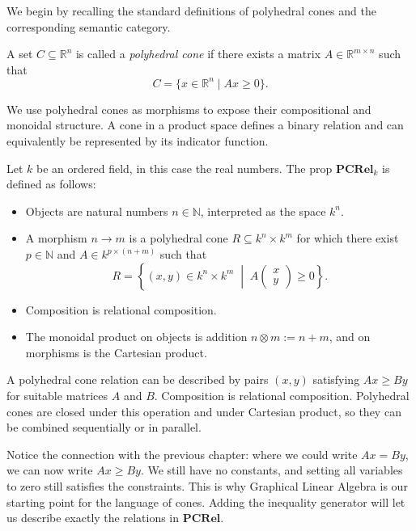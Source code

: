 We begin by recalling the standard definitions of polyhedral cones and the corresponding semantic category.

\begin{definition}\label{def:pcform}
    A set $C \subseteq \mathbb{R}^n$ is called a \emph{polyhedral cone} if
    there exists a matrix $A \in \mathbb{R}^{m \times n}$ such that
    \[
        C = \{x \in \mathbb{R}^n \mid Ax \ge 0\}.
    \]
\end{definition}

We use polyhedral cones as morphisms to expose their compositional and
monoidal structure. A cone in a product space defines a binary relation and
can equivalently be represented by its indicator function.

\begin{definition}
    Let $k$ be an ordered field, in this case the real numbers. The prop
    $\mathbf{PCRel}_k$ is defined as follows:
    \begin{itemize}
        \item Objects are natural numbers $n \in \mathbb{N}$, interpreted
            as the space $k^n$.
        \item A morphism $n \to m$ is a polyhedral cone
            $R \subseteq k^n \times k^m$
            for which there exist $p \in \mathbb{N}$ and
            $A \in k^{p \times (n+m)}$ such that
            \[
                R = \left\{ (x,y) \in k^n \times k^m \;\middle|\;
                A \begin{pmatrix} x \\ y \end{pmatrix} \ge 0 \right\}.
            \]
        \item Composition is relational composition.
        \item The monoidal product on objects is addition $n \otimes m := n+m$,
            and on morphisms is the Cartesian product.
    \end{itemize}
\end{definition}

A polyhedral cone relation can be described by pairs $(x,y)$ satisfying
$Ax\ge By$ for suitable matrices $A$ and $B$. Composition is relational
composition. Polyhedral cones are closed under this operation and under
Cartesian product, so they can be combined sequentially or in parallel.

Notice the connection with the previous chapter: where we could write
$Ax=By$, we can now write $Ax\ge By$. We still have no constants, and
setting all variables to zero still satisfies the constraints. This is
why Graphical Linear Algebra is our starting point for the language of cones.
Adding the inequality generator will let us describe exactly the
relations in $\mathbf{PCRel}$.

